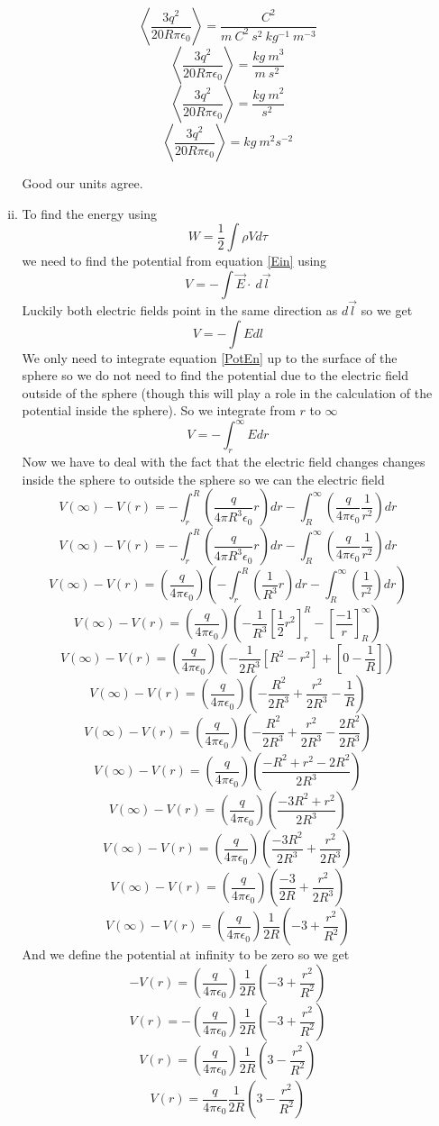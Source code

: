 \documentclass[11pt]{article}
\numberwithin{equation}{section}
\newcommand{\vecE}{\vec{E}}
\begin{document}
\begin{enumerate}[(a)]
\begin{enumerate}[(i)]
$$\left<\frac{3q^2}{20 R\pi\epsilon_0}\right> = \frac{C^2}{m\ C^2\ s^2\ kg^{-1}\ m^{-3}} $$
$$\left<\frac{3q^2}{20 R\pi\epsilon_0}\right>= \frac{kg\ m^3}{m\ s^2\ } $$
$$\left<\frac{3q^2}{20 R\pi\epsilon_0}\right>= \frac{kg\ m^2}{ s^2\ } $$
$$\left<\frac{3q^2}{20 R\pi\epsilon_0}\right>= kg\ m^2 s^{-2}$$

Good our units agree.
\item
To find the energy using 
\begin{equation}
W = \frac{1}{2}\int\rho Vd\tau
\label{PotEn}
\end{equation}
we need to find the potential from equation \ref{Ein} using
$$V = -\int \vecE\cdot\ d\vec{l}$$
Luckily both electric fields point in the same direction as $d\vec{l}$ so we get
$$V = -\int Edl$$
We only need to integrate equation \ref{PotEn} up to the surface of the sphere so we do not need to find the potential due to the electric field outside of the sphere (though this will play a role in the calculation of the potential inside the sphere). So we integrate from $r$ to $\infty$
$$V = -\int_r^{\infty}Edr$$
Now we have to deal with the fact that the electric field changes changes inside the sphere to outside the sphere so we can the electric field 
$$V(\infty) - V(r) = -\int_r^{R}\left(\frac{q}{4\pi R^3\epsilon_0}r\right)dr - \int_R^{\infty}\left(\frac{q}{4\pi\epsilon_0}\frac{1}{r^2}\right)dr$$
$$V(\infty) - V(r) = -\int_r^{R}\left(\frac{q}{4\pi R^3\epsilon_0}r\right)dr - \int_R^{\infty}\left(\frac{q}{4\pi\epsilon_0}\frac{1}{r^2}\right)dr$$
$$V(\infty) - V(r) =\left(\frac{q}{4\pi\epsilon_0}\right) \left(-\int_r^{R}\left(\frac{1}{R^3}r\right)dr - \int_R^{\infty}\left(\frac{1}{r^2}\right)dr\right)$$
$$V(\infty) - V(r) =\left(\frac{q}{4\pi\epsilon_0}\right) \left(-\frac{1}{R^3}\left[\frac{1}{2}r^2\right]_r^{R} - \left[\frac{-1}{r}\right]_R^{\infty}\right)$$
$$V(\infty) - V(r) =\left(\frac{q}{4\pi\epsilon_0}\right) \left(-\frac{1}{2R^3}\left[R^2-r^2\right] + \left[0-\frac{1}{R}\right]\right)$$
$$V(\infty) - V(r) =\left(\frac{q}{4\pi\epsilon_0}\right) \left(-\frac{R^2}{2R^3}+\frac{r^2}{2R^3} -\frac{1}{R}\right)$$
$$V(\infty) - V(r) =\left(\frac{q}{4\pi\epsilon_0}\right) \left(-\frac{R^2}{2R^3}+\frac{r^2}{2R^3} -\frac{2R^2}{2R^3}\right)$$
$$V(\infty) - V(r) =\left(\frac{q}{4\pi\epsilon_0}\right) \left(\frac{-R^2+r^2 -2R^2}{2R^3}\right)$$
$$V(\infty) - V(r) =\left(\frac{q}{4\pi\epsilon_0}\right) \left(\frac{-3R^2+r^2}{2R^3}\right)$$
$$V(\infty) - V(r) =\left(\frac{q}{4\pi\epsilon_0}\right) \left(\frac{-3R^2}{2R^3}+\frac{r^2}{2R^3}\right)$$
$$V(\infty) - V(r) =\left(\frac{q}{4\pi\epsilon_0}\right) \left(\frac{-3}{2R}+\frac{r^2}{2R^3}\right)$$
$$V(\infty) - V(r) =\left(\frac{q}{4\pi\epsilon_0}\right) \frac{1}{2R}\left(-3+\frac{r^2}{R^2}\right)$$
And we define the potential at infinity to be zero so we get
$$-V(r) =\left(\frac{q}{4\pi\epsilon_0}\right) \frac{1}{2R}\left(-3+\frac{r^2}{R^2}\right)$$
$$V(r) =-\left(\frac{q}{4\pi\epsilon_0}\right) \frac{1}{2R}\left(-3+\frac{r^2}{R^2}\right)$$
$$V(r) =\left(\frac{q}{4\pi\epsilon_0}\right) \frac{1}{2R}\left(3-\frac{r^2}{R^2}\right)$$
$$V(r) =\frac{q}{4\pi\epsilon_0} \frac{1}{2R}\left(3-\frac{r^2}{R^2}\right)$$


\end{enumerate}
\end{enumerate}
\end{document}
